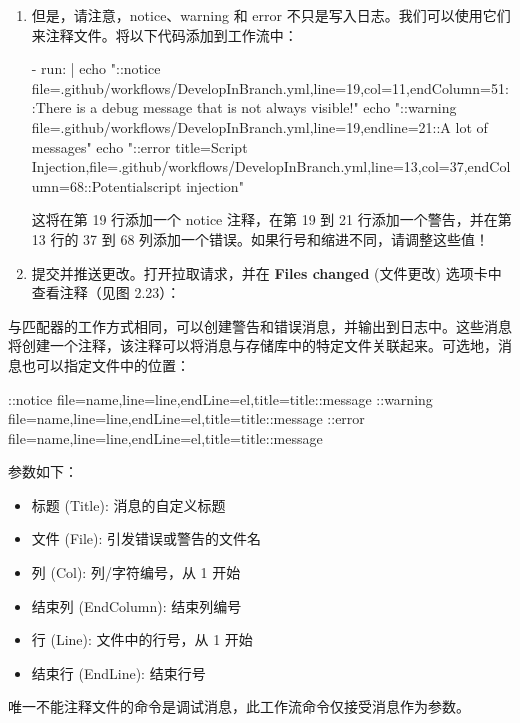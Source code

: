 \begin{enumerate}
\item 
但是，请注意，notice、warning 和 error 不只是写入日志。我们可以使用它们来注释文件。将以下代码添加到工作流中：

\begin{shell}
- run: |
  echo "::notice file=.github/workflows/DevelopInBranch.yml,line=19,col=11,endColumn=51::There is a debug message that is not always visible!"
  echo "::warning file=.github/workflows/DevelopInBranch.yml,line=19,endline=21::A lot of messages"
  echo "::error title=Script Injection,file=.github/workflows/DevelopInBranch.yml,line=13,col=37,endColumn=68::Potentialscript injection"
\end{shell}

这将在第 19 行添加一个 notice 注释，在第 19 到 21 行添加一个警告，并在第 13 行的 37 到 68 列添加一个错误。如果行号和缩进不同，请调整这些值！

\item 
提交并推送更改。打开拉取请求，并在 \textbf{Files changed }(文件更改) 选项卡中查看注释（见图 2.23）：

\end{enumerate}


与匹配器的工作方式相同，可以创建警告和错误消息，并输出到日志中。这些消息将创建一个注释，该注释可以将消息与存储库中的特定文件关联起来。可选地，消息也可以指定文件中的位置：

\begin{shell}
::notice file={name},line={line},endLine={el},title={title}::{message}
::warning
file={name},line={line},endLine={el},title={title}::{message}
::error file={name},line={line},endLine={el},title={title}::{message}
\end{shell}

参数如下：

\begin{itemize}
\item 
标题 (Title): 消息的自定义标题

\item 
文件 (File): 引发错误或警告的文件名

\item 
列 (Col): 列/字符编号，从 1 开始

\item 
结束列 (EndColumn): 结束列编号

\item 
行 (Line): 文件中的行号，从 1 开始

\item 
结束行 (EndLine): 结束行号
\end{itemize}

唯一不能注释文件的命令是调试消息，此工作流命令仅接受消息作为参数。
